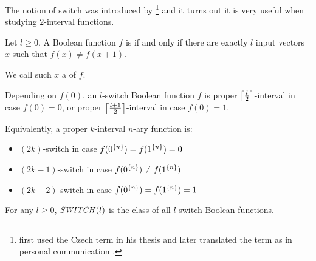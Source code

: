 The notion of switch was introduced by \citeauthor{Husek2014}\footnote{
\citeauthor{Husek2014} first used the Czech term
in his thesis \citep[p.~13]{Husek2014}
and later translated the term as 
in personal communication \citep{Husek2015}.
}
and it turns out it is very useful when studying $2$-interval functions.

\begin{definition}
Let $l \geq 0$.
A Boolean function $f$ is 
if and only if
there are exactly $l$ input vectors $x$ such that
$f(x) \neq f(x+1)$.

We call such $x$ a  of $f$.
\end{definition}

\begin{example}
\label{example:switchesintervals}
Depending on $f(0)$,
an $l$-switch Boolean function $f$
is proper $\ceil*{\frac{l}{2}}$-interval
in case $f(0) = 0$,
or proper $\ceil*{\frac{l+1}{2}}$-interval
in case $f(0) = 1$.

Equivalently,
a proper $k$-interval $n$-ary function is:
\begin{itemize}
\item
$(2k)$-switch in case $f(\rep{0}{n}) = f(\rep{1}{n}) = 0$
\item
$(2k-1)$-switch in case $f(\rep{0}{n}) \neq f(\rep{1}{n})$
\item
$(2k-2)$-switch in case $f(\rep{0}{n}) = f(\rep{1}{n}) = 1$
\end{itemize}
\end{example}


\begin{definition}
[$\switchfns{l}$]
\label{def:switchfns}
For any $l \geq 0$,
$\switchfns{l}$ is the class
of all $l$-switch Boolean functions.
\end{definition}
